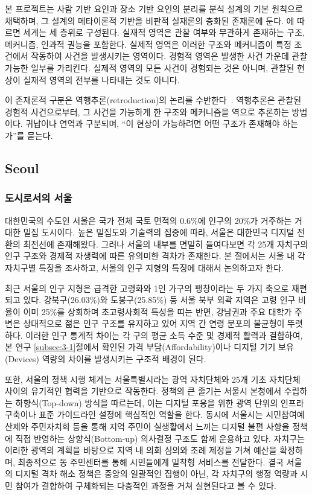 본 프로젝트는 사람 기반 요인과 장소 기반 요인의 분리를 분석 설계의 기본 원칙으로 채택하며, 그 설계의 메타이론적 기반을 비판적 실재론의 층화된 존재론에 둔다. \citet{Bhaskar1975}에 따르면 세계는 세 층위로 구성된다. 실재적 영역은 관찰 여부와 무관하게 존재하는 구조, 메커니즘, 인과적 권능을 포함한다. 실제적 영역은 이러한 구조와 메커니즘이 특정 조건에서 작동하여 사건을 발생시키는 영역이다. 경험적 영역은 발생한 사건 가운데 관찰 가능한 일부를 가리킨다. 실제적 영역의 모든 사건이 경험되는 것은 아니며, 관찰된 현상이 실재적 영역의 전부를 나타내는 것도 아니다.

이 존재론적 구분은 역행추론(retroduction)의 논리를 수반한다~\citep{Bhaskar1975}. 역행추론은 관찰된 경험적 사건으로부터, 그 사건을 가능하게 한 구조와 메커니즘을 역으로 추론하는 방법이다. 귀납이나 연역과 구분되며, \enquote{이 현상이 가능하려면 어떤 구조가 존재해야 하는가}를 묻는다.

\subsection{Seoul}
\label{subsec:2-2}

\subsubsection{도시로서의 서울}
\label{subsubsec:2-2-1}

대한민국의 수도인 서울은 국가 전체 국토 면적의 0.6\%에 인구의 20\%가 거주하는 거대한 밀집 도시이다. 높은 밀집도와 기술력의 집중에 따라, 서울은 대한민국 디지털 전환의 최전선에 존재해왔다. 그러나 서울의 내부를 면밀히 들여다보면 각 25개 자치구의 인구 구조와 경제적 자생력에 따른 유의미한 격차가 존재한다. 본 절에서는 서울 내 각 자치구별 특징을 조사하고, 서울의 인구 지형의 특징에 대해서 논의하고자 한다.

최근 서울의 인구 지형은 급격한 고령화와 1인 가구의 팽창이라는 두 가지 축으로 재편되고 있다. 강북구(26.03\%)와 도봉구(25.85\%) 등 서울 북부 외곽 지역은 고령 인구 비율이 이미 25\%를 상회하며 초고령사회적 특성을 띠는 반면, 강남권과 주요 대학가 주변은 상대적으로 젊은 인구 구조를 유지하고 있어 지역 간 연령 분포의 불균형이 뚜렷하다. 이러한 인구 통계적 차이는 각 구의 평균 소득 수준 및 경제적 활력과 결합하여, 본 연구 \ref{subsec:3-1}절에서 확인된 가격 부담(Affordability)이나 디지털 기기 보유(Devices) 역량의 차이를 발생시키는 구조적 배경이 된다.


또한, 서울의 정책 시행 체계는 서울특별시라는 광역 자치단체와 25개 기초 자치단체 사이의 유기적인 협력을 기반으로 작동한다. 정책의 큰 줄기는 서울시 본청에서 수립하는 하향식(Top-down) 방식을 따르는데, 이는 디지털 포용을 위한 광역 단위의 인프라 구축이나 표준 가이드라인 설정에 핵심적인 역할을 한다. 동시에 서울시는 시민참여예산제와 주민자치회 등을 통해 지역 주민이 실생활에서 느끼는 디지털 불편 사항을 정책에 직접 반영하는 상향식(Bottom-up) 의사결정 구조도 함께 운용하고 있다. 자치구는 이러한 광역의 계획을 바탕으로 지역 내 의회 심의와 조례 제정을 거쳐 예산을 확정하며, 최종적으로 동 주민센터를 통해 시민들에게 밀착형 서비스를 전달한다. 결국 서울의 디지털 격차 해소 정책은 중앙의 일괄적인 집행이 아닌, 각 자치구의 행정 역량과 시민 참여가 결합하여 구체화되는 다층적인 과정을 거쳐 실현된다고 볼 수 있다.

